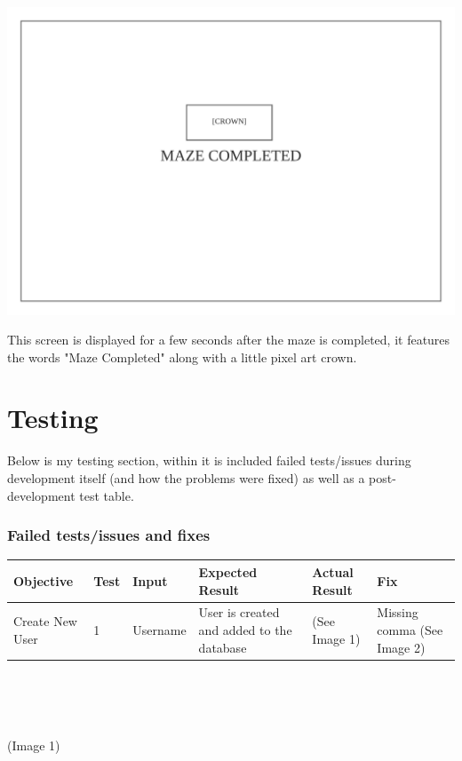 \documentclass{article}
\begin{document}
\clearpage
\begin{center}
	\includegraphics[scale=0.7]{Maze Completed}

	This screen is displayed for a few seconds after the maze is completed, it features the words "Maze Completed" along with a little pixel art crown.
\end{center}

\clearpage
\part{Testing}
Below is my testing section, within it is included failed tests/issues during development itself (and how the problems were fixed) as well as a post-development test table.
\section{Failed tests/issues and fixes}
\begin{tabular}{|P{3.5cm}|P{0.8cm}|P{3cm}|P{4cm}|P{3cm}|P{3cm}| }
\hline
 \textbf{Objective} & \textbf{Test} & \textbf{Input} & \textbf{Expected Result} & \textbf{Actual Result} & \textbf{Fix} \\
\hline
Create New User & 1 & Username & User is created and added to the database & (See Image 1) & Missing comma (See Image 2) \\
\hline
\end{tabular}
\\
\begin{center}
\\
\vphantom{0}
\\
\color{mygrey}(Image 1)
\end{center}
\end{document}
